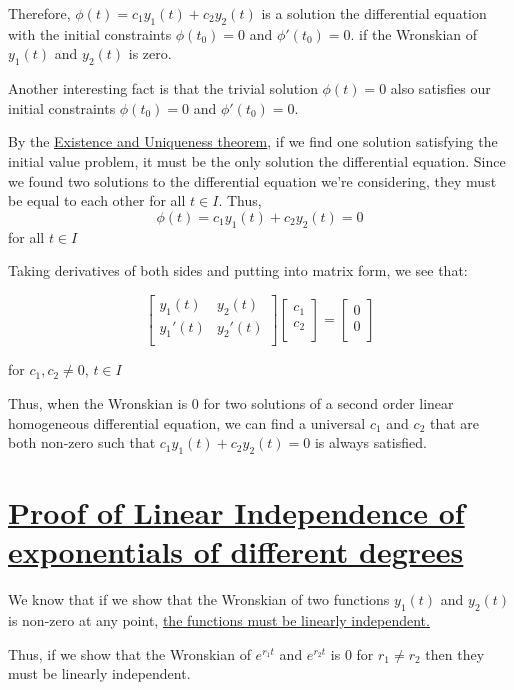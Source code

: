 \documentclass{report}
\begin{document}
Therefore, $\phi(t) = c_1y_1(t) + c_2y_2(t)$ is a solution the differential equation with the initial constraints $\phi(t_0) = 0$ and $\phi'(t_0) = 0$. if the Wronskian of $y_1(t)$ and $y_2(t)$ is zero. 

Another interesting fact is that the trivial solution $\phi(t) = 0$ also satisfies our initial constraints $\phi(t_0) = 0$ and $\phi'(t_0) = 0$.

By the  \hyperref[Ex&Un]{Existence and Uniqueness theorem}, if we find one solution satisfying the initial value problem, it must be the only solution the differential equation. Since we found two solutions to the differential equation we're considering, they must be equal to each other for all $t \in I$.
Thus,
$$\phi(t) = c_1y_1(t) +c_2y_2(t) = 0$$
for all $t \in I$

Taking derivatives of both sides and putting into matrix form, we see that:

$$
\begin{bmatrix}
    y_1(t) & y_2(t) \\
    y_1'(t) & y_2'(t) \\
\end{bmatrix}
\begin{bmatrix}
    c_1 \\
    c_2 \\
\end{bmatrix}
=
\begin{bmatrix}
    0 \\
    0 \\
\end{bmatrix}
$$

for $c_1, c_2 \neq 0$, $t \in I$

Thus, when the Wronskian is 0 for two solutions of a second order linear homogeneous differential equation, we can find a universal $c_1$ and $c_2$ that are both non-zero such that $c_1y_1(t) +c_2y_2(t) = 0$ is always satisfied. 


\section{\hyperref[th:expLinInd]{Proof of Linear Independence of exponentials of different degrees}}
\label{sec:prExpLinInd}
We know that  if we show that the Wronskian of two functions $y_1(t)$ and $y_2(t)$ is non-zero at any point, \hyperref[th:wronLinInd]{the functions must be linearly independent.}

Thus, if we show that the Wronskian of $e^{r_1t}$ and $e^{r_2t}$ is 0 for $r_1 \neq r_2$ then they must be linearly independent.
\end{document}
